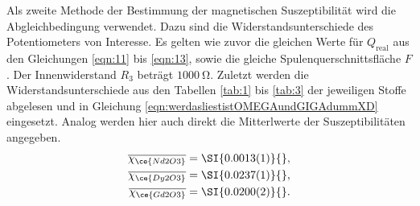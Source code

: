 Als zweite Methode der Bestimmung der magnetischen Suszeptibilität wird die Abgleichbedingung verwendet. Dazu sind die Widerstandsunterschiede des Potentiometers von Interesse.
Es gelten wie zuvor die gleichen Werte für $Q_{\text{real}}$ aus den Gleichungen \eqref{eqn:11} bis \eqref{eqn:13}, sowie die gleiche Spulenquerschnittsfläche $F$. Der Innenwiderstand $R_{3}$ beträgt $\SI{1000}{\ohm}$.
Zuletzt werden die Widerstandsunterschiede aus den Tabellen \ref{tab:1} bis \ref{tab:3} der jeweiligen Stoffe abgelesen und in Gleichung \eqref{eqn:werdasliestistOMEGAundGIGAdummXD} eingesetzt.
Analog werden hier auch direkt die Mitterlwerte der Suszeptibilitäten angegeben.
\begin{align*}
    \overline{\chi_{\ce{Nd2O3}}} &= \SI{0.0013(1)}{},\\
    \overline{\chi_{\ce{Dy2O3}}} &= \SI{0.0237(1)}{},\\
    \overline{\chi_{\ce{Gd2O3}}} &= \SI{0.0200(2)}{}.
\end{align*}
